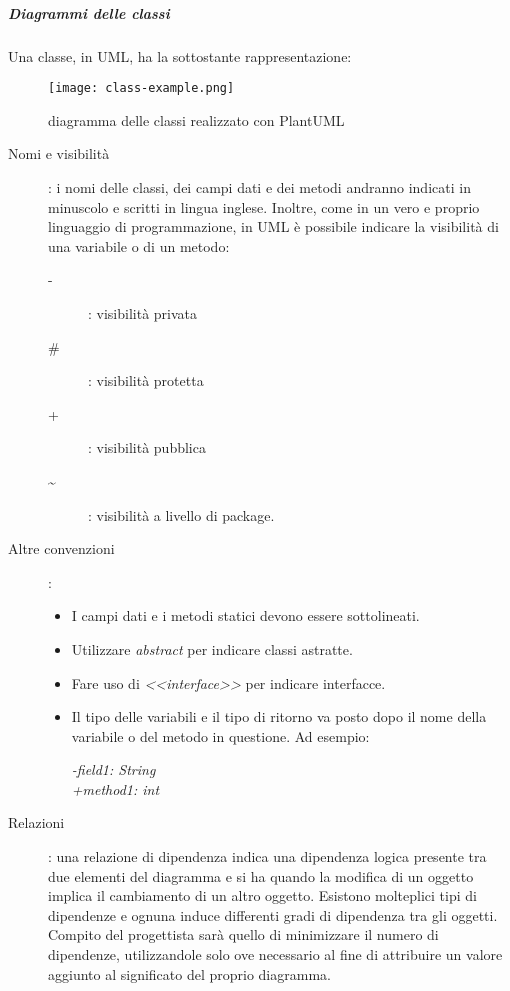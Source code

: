 \documentclass[../../norme-di-progetto.tex]{subfiles}
\begin{document}
\subparagraph{Diagrammi delle classi}%
\label{subp:diagrammi_delle_classi}
Una classe, in UML, ha la sottostante rappresentazione:
\begin{figure}[H]%
  \label{fig:classe_uml}
  \texttt{[image: class-example.png]}
  \centering
  \caption{diagramma delle classi realizzato con PlantUML}
\end{figure}
\begin{description}
  \item [Nomi e visibilità]: i nomi delle classi, dei campi dati e dei metodi andranno indicati in minuscolo e scritti in lingua inglese.
        Inoltre, come in un vero e proprio linguaggio di programmazione, in UML è possibile indicare la visibilità di una variabile o di un metodo:
        \begin{description}
          \item [-]: visibilità privata
          \item [\#]: visibilità protetta
          \item [+]: visibilità pubblica
          \item [\textasciitilde]: visibilità a livello di package.
        \end{description}
  \item[Altre convenzioni]:
        \begin{itemize}
          \item I campi dati e i metodi statici devono essere sottolineati.
          \item Utilizzare \textit{{abstract}} per indicare classi astratte.
          \item Fare uso di \textit{<<interface>>} per indicare interfacce.
          \item Il tipo delle variabili e il tipo di ritorno va posto dopo il nome della variabile o del metodo in questione. Ad esempio:
                \begin{center}
                  \textit{-field1: String} \\\textit{+method1: int}
                \end{center}
        \end{itemize}
  \item [Relazioni]: una relazione di dipendenza indica una dipendenza logica presente tra due elementi del diagramma e si ha quando la modifica di un oggetto implica il cambiamento di un altro oggetto.
        Esistono molteplici tipi di dipendenze e ognuna induce differenti gradi di dipendenza tra gli oggetti.
        Compito del progettista sarà quello di minimizzare il numero di dipendenze, utilizzandole solo ove necessario al fine di attribuire un valore aggiunto al significato del proprio diagramma.

\end{description}
\end{document}
